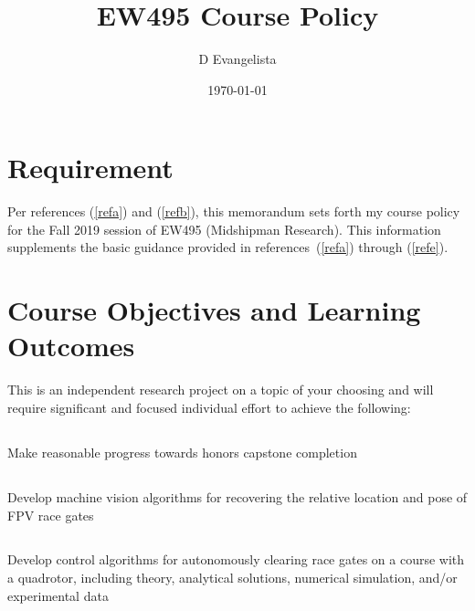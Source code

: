 \documentclass[10pt,courier]{navymemo}
\author{D Evangelista}
\title{EW495 Course Policy}
\date{\today}
\begin{document}
\makedateblock{}

\MEMORANDUM{}

\begin{navyletterheader}
\navyskip{}%

\navysubjline{}
\navyskip{}%
\end{navyletterheader}

\section{Requirement}
Per references (\ref{refa}) and (\ref{refb}), this memorandum sets forth my course policy for the Fall 2019 session of EW495 (Midshipman Research).  This information supplements the basic guidance provided in references~(\ref{refa}) through (\ref{refe}). 

\section{Course Objectives and Learning Outcomes}  This is an independent research project on a topic of your choosing and will require significant and focused individual effort to achieve the following:
\subsection{} Make reasonable progress towards honors capstone completion
\subsection{} Develop machine vision algorithms for recovering the relative location and pose of FPV race gates
\subsection{} Develop control algorithms for autonomously clearing race gates on a course with a quadrotor, including theory, analytical solutions, numerical simulation, and/or experimental data
\end{document}
